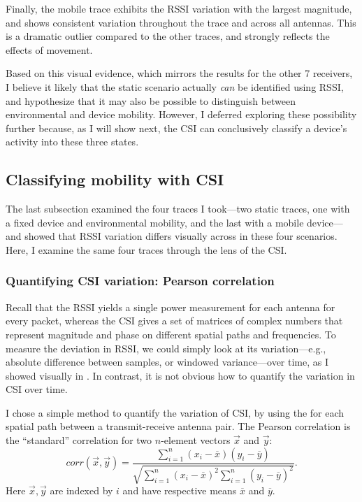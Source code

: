 Finally, the mobile trace exhibits the RSSI variation with the largest magnitude, and shows consistent variation throughout the trace and across all antennas. This is a dramatic outlier compared to the other traces, and strongly reflects the effects of movement.

Based on this visual evidence, which mirrors the results for the other 7 receivers, I believe it likely that the static scenario actually \emph{can} be identified using RSSI, and hypothesize that it may also be possible to distinguish between environmental and device mobility. However, I deferred exploring these possibility further because, as I will show next, the CSI can conclusively classify a device's activity into these three states.

\subsection{Classifying mobility with CSI}
The last subsection examined the four traces I took---two static traces, one with a fixed device and environmental mobility, and the last with a mobile device---and showed that RSSI variation differs visually across in these four scenarios. Here, I examine the same four traces through the lens of the CSI.

\subsubsection{Quantifying CSI variation: Pearson correlation}
Recall that the RSSI yields a single power measurement for each antenna for every packet, whereas the CSI gives a set of matrices of complex numbers that represent magnitude and phase on different spatial paths and frequencies. To measure the deviation in RSSI, we could simply look at its variation---e.g., absolute difference between samples, or windowed variance---over time, as I showed visually in . In contrast, it is not obvious how to quantify the variation in CSI over time.

I chose a simple method to quantify the variation of CSI, by using the  for each spatial path between a transmit-receive antenna pair. The Pearson correlation is the ``standard'' correlation for two $n$-element vectors $\vec{x}$ and $\vec{y}$:
\begin{equation}
\textit{corr}(\vec{x},\vec{y}) = \frac{\sum_{i=1}^n(x_i-\overline{x})(y_i-\overline{y})}{\sqrt{\sum_{i=1}^n(x_i-\overline{x})^2 \sum_{i=1}^n(y_i-\overline{y})^2}}.
\end{equation}
Here $\vec{x},\vec{y}$ are indexed by $i$ and have respective means $\overline{x}$ and $\overline{y}$.

